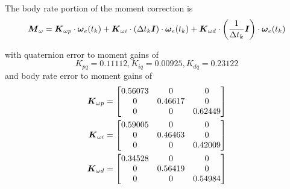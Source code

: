 The body rate portion of the moment correction is
\begin{equation}
  \boldsymbol{M}_{\omega} = \boldsymbol{K}_{\omega p} \cdot \boldsymbol{\omega}_e(t_{k}) + \boldsymbol{K}_{\omega i} \cdot (\Delta t_k \boldsymbol{I})\cdot \boldsymbol{\omega}_e(t_{k}) + \boldsymbol{K}_{\omega d} \cdot \left(\frac{1}{\Delta t_k} \boldsymbol{I}\right) \cdot \boldsymbol{\omega}_e(t_{k})
\end{equation}



with quaternion error to moment gains of
\begin{equation}
  K_{pq} = 0.11112, K_{iq} = 0.00925, K_{dq} = 0.23122
\end{equation}
and body rate error to moment gains of
\begin{equation}
  \begin{aligned}
  \boldsymbol{K}_{\omega p} &= \begin{bmatrix} 0.56073&0&0 \\ 0&0.46617&0 \\ 0&0&0.62449 \end{bmatrix} \\
  \boldsymbol{K}_{\omega i} &= \begin{bmatrix} 0.59005&0&0 \\ 0&0.46463&0 \\ 0&0&0.42009 \end{bmatrix} \\
  \boldsymbol{K}_{\omega d} &= \begin{bmatrix} 0.34528&0&0 \\ 0&0.56419&0 \\ 0&0&0.54984 \end{bmatrix} \\
  \end{aligned}
\end{equation}






